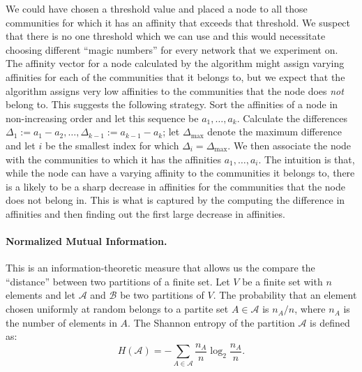 We could have chosen a threshold value and placed a node to all those communities for which 
it has an affinity that exceeds that threshold. We suspect that there is no one threshold 
which we can use and this would necessitate choosing different ``magic numbers'' for every network 
that we experiment on. The affinity vector for a node calculated by the 
algorithm might assign varying affinities for each of the communities that it belongs to, but we expect 
that the algorithm assigns very low affinities to the communities that the node does \emph{not} belong to. 
This suggests the following strategy. Sort the affinities of a node in non-increasing order and let this 
sequence be $a_1, \ldots, a_k$. Calculate the differences $\Delta_{1} := a_1 - a_2, \ldots, 
\Delta_{k-1} := a_{k - 1} - a_k$; let $\Delta_{\mathrm{max}}$ denote the maximum difference 
and let $i$ be the smallest index for which $\Delta_i = \Delta_{\mathrm{max}}$. We then associate 
the node with the communities to which it has the affinities $a_1, \ldots, a_i$. 
The intuition is that, while the node can have a varying affinity to the communities it belongs to, 
there is a likely to be a sharp decrease in affinities for the communities that the node does 
not belong in. This is what is captured by the computing the difference in affinities and then finding 
out the first large decrease in affinities.

\paragraph{Normalized Mutual Information.}
This is an information-theoretic measure that allows us the 
compare the ``distance'' between two partitions of a finite set. Let $V$ be a finite set 
with $n$ elements and let $\mathcal{A}$ and $\mathcal{B}$ be two partitions of $V$. The probability that an 
element chosen uniformly at random belongs to a partite set $A \in \mathcal{A}$ is $n_A/n$, where $n_A$ 
is the number of elements in $A$. The Shannon entropy of the partition $\mathcal{A}$ 
is defined as:
\begin{equation}\label{eqn:shannon_entropy}
H(\mathcal{A}) = - \sum_{A \in \mathcal{A}} \frac{n_A}{n} \log_2 \frac{n_A}{n}.
\end{equation}

